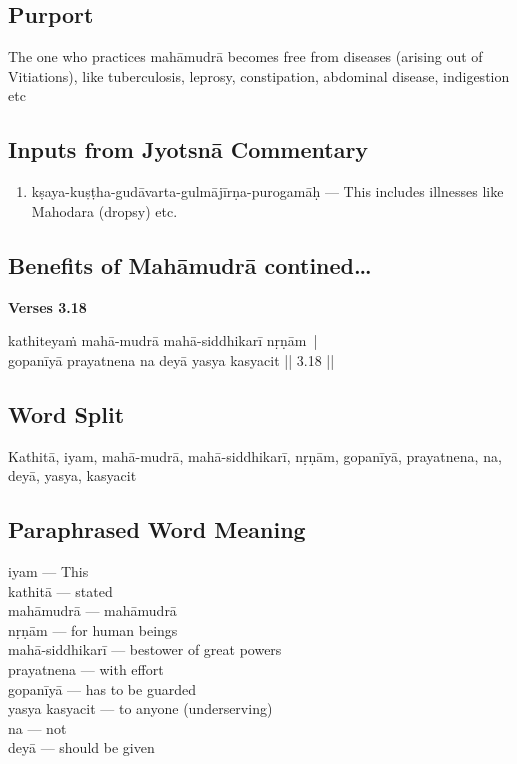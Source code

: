 \subsection*{Purport}

The one who practices mahāmudrā becomes free from diseases (arising out of Vitiations), like tuberculosis, leprosy, constipation, abdominal disease, indigestion etc 

\subsection*{Inputs from Jyotsnā Commentary}

\begin{enumerate}
\item kṣaya-kuṣṭha-gudāvarta-gulmājīrṇa-purogamāḥ --- This includes illnesses like Mahodara (dropsy) etc.   
\end{enumerate}

\subsection*{Benefits of Mahāmudrā contined…}

\noindent \textbf{Verses 3.18}

\begin{shloka}
kathiteyaṁ mahā-mudrā mahā-siddhikarī nṛṇām |\\
gopanīyā prayatnena na deyā yasya kasyacit || 3.18 ||
\end{shloka}

\subsection*{Word Split}

Kathitā, iyam, mahā-mudrā, mahā-siddhikarī, nṛṇām, gopanīyā, prayatnena, na, deyā, yasya, kasyacit

\subsection*{Paraphrased Word Meaning}

\begin{multicols}{2}
iyam --- This \\
kathitā --- stated \\
mahāmudrā --- mahāmudrā\\
nṛṇām --- for human beings \\
mahā-siddhikarī --- bestower of great powers \\
prayatnena --- with effort \\
gopanīyā --- has to be guarded \\
yasya kasyacit --- to anyone (underserving)\\
na --- not \\
deyā --- should be given 
\end{multicols}

